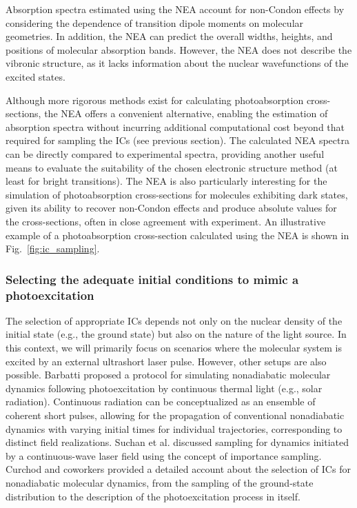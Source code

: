 \documentclass[9pt,bestpractices]{livecoms}
\begin{document}
Absorption spectra estimated using the NEA account for non-Condon effects by considering the dependence of transition dipole moments on molecular geometries. In addition, the NEA can predict the overall widths, heights, and positions of molecular absorption bands. However, the NEA does not describe the vibronic structure, as it lacks information about the nuclear wavefunctions of the excited states.\cite{crespo2014spectrum,crespo2018recent}

Although more rigorous methods exist for calculating photoabsorption cross-sections,\cite{prlj2021calculating,santoro2016beyondvert} the NEA offers a convenient alternative, enabling the estimation of absorption spectra without incurring additional computational cost beyond that required for sampling the ICs (see previous section). The calculated NEA spectra can be directly compared to experimental spectra, providing another useful means to evaluate the suitability of the chosen electronic structure method (at least for bright transitions). The NEA is also particularly interesting for the simulation of photoabsorption cross-sections for molecules exhibiting dark states, given its ability to recover non-Condon effects and produce absolute values for the cross-sections, often in close agreement with experiment.\cite{prlj2021calculating} An illustrative example of a photoabsorption cross-section calculated using the NEA is shown in Fig.~\ref{fig:ic_sampling}.

\subsubsection{Selecting the adequate initial conditions to mimic a photoexcitation}
\label{sec:initcond}

The selection of appropriate ICs depends not only on the nuclear density of the initial state (e.g., the ground state) but also on the nature of the light source. In this context, we will primarily focus on scenarios where the molecular system is excited by an external ultrashort laser pulse. However, other setups are also possible. Barbatti\cite{barbatti2020simulation} proposed a protocol for simulating nonadiabatic molecular dynamics following photoexcitation by continuous thermal light (e.g., solar radiation). Continuous radiation can be conceptualized as an ensemble of coherent short pulses, allowing for the propagation of conventional nonadiabatic dynamics with varying initial times for individual trajectories, corresponding to distinct field realizations. Suchan et al.\cite{suchan2018importance} discussed sampling for dynamics initiated by a continuous-wave laser field using the concept of importance sampling. Curchod and coworkers\cite{janos2025selecting} provided a detailed account about the selection of ICs for nonadiabatic molecular dynamics, from the sampling of the ground-state distribution to the description of the photoexcitation process in itself. 
\end{document}
